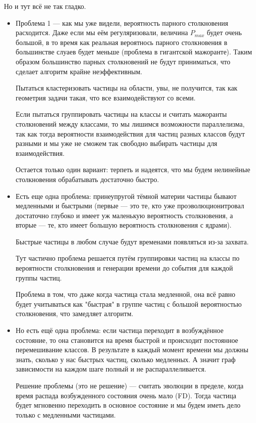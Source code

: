 Но и тут всё не так гладко. 
\begin{itemize}
	\item Проблема 1 --- как мы уже видели, вероятность парного столкновения расходится. Даже если мы еём регуляризовали, величина $P_{max}$ будет очень большой, в то время как реальная вероятнось парного столкновения в большинстве слуаев будет меньше (проблема в гигантской мажоранте). Таким образом большинство парных столкновений не будут приниматься, что сделает алгоритм крайне неэффективным. 
	
	Пытаться кластеризовать частицы на области, увы, не получится, так как геометрия задачи такая, что все взаимодействуют со всеми.

	Если пытаться группировать частицы на классы и считать мажоранты столкновений между классами, то мы лишимся возможности параллелизма, так как тогда вероятности взаимодействия для частиц разных классов будут разными и мы уже не сможем так свободно выбирать частицы для взаимодействия.
	
	Остается только один вариант: терпеть и надеятся, что мы будем нелинейные столкновения обрабатывать достаточно быстро.

	\item Есть еще одна проблема: принеупругой тёмной материи частицы бывают медленными и быстрыми (первые --- это те, кто уже проэволюционитровал достаточно глубоко и имеет уж маленькую вероятность столкновения, а вторые --- те, кто имеет большую вероятность столкновения с ядрами).
	
	Быстрые частицы в любом случае будут временами появляться из-за захвата.

	Тут частично проблема решается путём группировки частиц на классы по вероятности столкновения и генерации времени до события для каждой группы частиц. 

	Проблема в том, что даже когда частица стала медленной, она всё равно будет учитываться как "быстрая" в группе частиц с большой вероятностью столкновения, что замедляет алгоритм.

	\item Но есть ещё одна проблема: если частица переходит в возбуждённое состояние, то она становится на время быстрой и происходит постоянное перемешивание классов. В результате в каждый момент времени мы должны знать, сколько у нас быстрых частиц, сколько медленных. А значит граф зависимости на каждом шаге полный и не распараллеливается.
	
	Решение проблемы (это не решение) --- считать эволюции в пределе, когда время распада возбужденного состояния очень мало (FD). Тогда частица будет мгновенно переходить в основное состояние и мы будем иметь дело только с медленными частицами.
\end{itemize}




